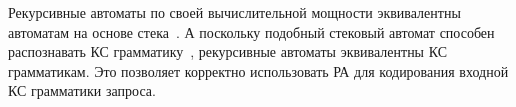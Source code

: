 \documentclass[14pt]{matmex-diploma-custom}
\begin{document}
Рекурсивные автоматы по своей вычислительной мощности эквивалентны автоматам на основе стека~\cite{article:recursive_state_machines}. А поскольку подобный стековый автомат способен распознавать КС грамматику~\cite{book:automata_theory}, рекурсивные автоматы эквивалентны КС грамматикам. Это позволяет корректно использовать РА для кодирования входной КС грамматики запроса.





\setmonofont[Mapping=tex-text]{CMU Typewriter Text}


\end{document}
